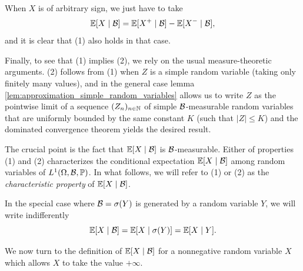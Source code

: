 \documentclass[../Main.tex]{subfiles}
\begin{document}
{When $X$ is of arbitrary sign, we just have to take
\[ \mathbb{E}[X \mid \mathcal{B}] = \mathbb{E}[X^+ \mid \mathcal{B}] - \mathbb{E}[X^- \mid \mathcal{B}], \]
and it is clear that (1) also holds in that case.

Finally, to see that (1) implies (2), we rely on the usual measure-theoretic arguments. (2) follows from (1) when $Z$ is a simple random variable (taking only finitely many values), and in the general case lemma \ref{lem:approximation_simple_random_variables} allows us to write $Z$ as the pointwise limit of a sequence $(Z_n)_{n \in \mathbb{N}}$ of simple $\mathcal{B}$-measurable random variables that are uniformly bounded by the same constant $K$ (such that $|Z| \le K$) and the dominated convergence theorem yields the desired result.
}

The crucial point is the fact that $\mathbb{E}[X \mid \mathcal{B}]$ is $\mathcal{B}$-measurable. Either of properties (1) and (2) characterizes the conditional expectation $\mathbb{E}[X \mid \mathcal{B}]$ among random variables of $L^1(\Omega,\mathcal{B},\mathbb{P})$. In what follows, we will refer to (1) or (2) as the \emph{characteristic property} of $\mathbb{E}[X \mid \mathcal{B}]$.

In the special case where $\mathcal{B} = \sigma(Y)$ is generated by a random variable $Y$, we will write indifferently
\[ \mathbb{E}[X \mid \mathcal{B}] = \mathbb{E}[X \mid \sigma(Y)] = \mathbb{E}[X \mid Y]. \]


We now turn to the definition of $\mathbb{E}[X \mid \mathcal{B}]$ for a nonnegative random variable $X$ which allows $X$ to take the value $+\infty$.
\end{document}
